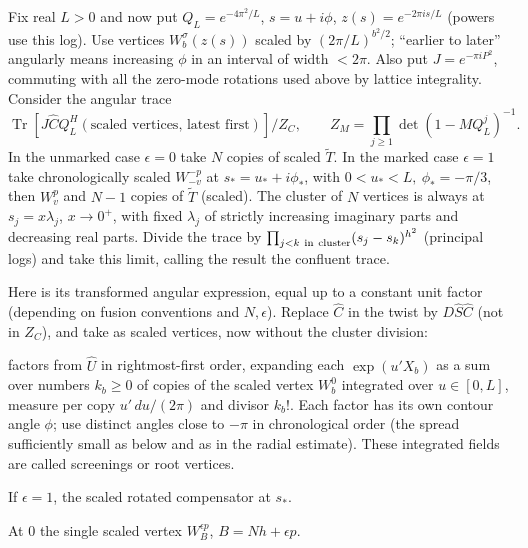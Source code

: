 Fix real \(L>0\) and now put \(Q_L=e^{-4\pi^2/L}\), \(s=u+i\phi\), \(z(s)=e^{-2\pi i s/L}\) (powers use this log). Use vertices \(W_b^\sigma(z(s))\) scaled by \((2\pi/L)^{b^2/2}\); ``earlier to later'' angularly means increasing \(\phi\) in an interval of width \(<2\pi\). Also put \(J=e^{-\pi i P^2}\), commuting with all the zero-mode rotations used above by lattice integrality. Consider the angular trace
\[
 \operatorname{Tr}\!\left[J\widehat C Q_L^H (\text{scaled vertices, latest first})\right]/Z_C,\qquad
 Z_M=\prod_{j\ge1}\det(1-M Q_L^j)^{-1}.
\]
In the unmarked case \(\epsilon=0\) take \(N\) copies of scaled \(\widetilde T\). In the marked case \(\epsilon=1\) take chronologically scaled \(W_{-v}^{-p}\) at \(s_*=u_*+i\phi_*\), with \(0<u_*<L,\ \phi_*=-\pi/3\), then \(W_v^p\) and \(N-1\) copies of \(\widetilde T\) (scaled). The cluster of \(N\) vertices is always at \(s_j=x\lambda_j\), \(x\to0^+\), with fixed \(\lambda_j\) of strictly increasing imaginary parts and decreasing real parts. Divide the trace by \(\prod_{j<k\ {\rm in\ cluster}}(s_j-s_k)^{h^2}\) (principal logs) and take this limit, calling the result the confluent trace.

Here is its transformed angular expression, equal up to a constant unit factor (depending on fusion conventions and \(N,\epsilon\)). Replace \(\widehat C\) in the twist by \(D\widehat S\widehat C\) (not in \(Z_C\)), and take as scaled vertices, now without the cluster division:
\par\noindent\textbullet\quad factors from \(\widehat U\) in rightmost-first order, expanding each \(\exp(u' X_b)\) as a sum over numbers \(k_b\ge0\) of copies of the scaled vertex \(W_b^0\) integrated over \(u\in[0,L]\), measure per copy \(u'\,du/(2\pi)\) and divisor \(k_b!\). Each factor has its own contour angle \(\phi\); use distinct angles close to \(-\pi\) in chronological order (the spread sufficiently small as below and as in the radial estimate). These integrated fields are called screenings or root vertices.
\par\noindent\textbullet\quad If \(\epsilon=1\), the scaled rotated compensator at \(s_*\).
\par\noindent\textbullet\quad At 0 the single scaled vertex \(W_B^{\epsilon p}\), \(B=N h+\epsilon p\).

